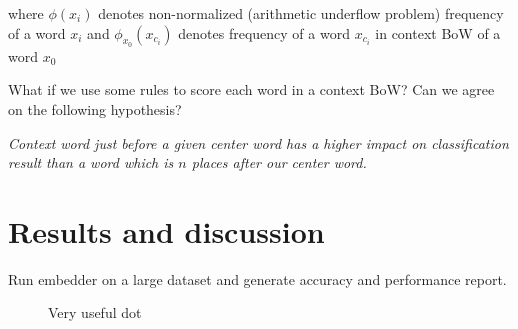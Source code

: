 \documentclass{article}
\newcommand{\fig}[2]{
	\begin{figure}[!htb]
		\center{\texttt{[image: res/\#1]}}
		\caption{\label{fig:caption} #2}
	\end{figure}
}
\begin{document}
where $\phi(x_i)$ denotes non-normalized (arithmetic underflow problem)
frequency of a word $x_i$ and $\phi_{x_0}(x_{c_i})$ denotes frequency of
a word $x_{c_i}$ in context BoW of a word $x_0$

What if we use some rules to score each word in a context BoW? Can we agree
on the following hypothesis?

\medbreak

\textit{Context word just before a given center word has a
higher impact on classification result than a word which is $n$ places after our
center word.}

\section{Results and discussion}

Run embedder on a large dataset and generate accuracy and performance report.

\fig{chart}{Very useful dot}



\end{document}
